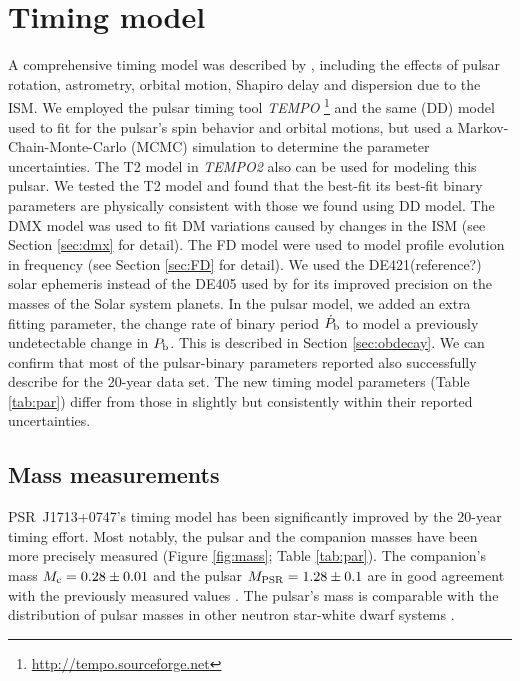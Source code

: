 \section{Timing model}
\label{sec:model}
A comprehensive timing model was described by \citet{sns+05},
including the effects of pulsar rotation, astrometry, orbital motion,
Shapiro delay and dispersion due to the ISM.
We employed the pulsar timing tool \textit{TEMPO}
\footnote{\url{http://tempo.sourceforge.net}} and the same
\citet{dd86} (DD) model \citet{sns+05} used to fit for the pulsar's
spin behavior and orbital motions, but used a Markov-Chain-Monte-Carlo
(MCMC) simulation to determine the parameter uncertainties.
The T2 model \citep{??} in \textit{TEMPO2} \citep{hem06} also can be used for modeling this pulsar. We tested the T2 model and found that the best-fit its best-fit binary parameters are physically consistent with those we found using DD model.
The DMX model was used to fit DM variations caused by changes in the ISM (see Section \ref{sec:dmx} for detail). The FD model were used to model profile
evolution in frequency (see Section \ref{sec:FD} for detail). 
We used the DE421(reference?) solar ephemeris instead of the DE405 used by
\citet{sns+05} for its improved precision on the masses of the Solar system planets. 
In the pulsar model, we added an extra fitting parameter, the change rate of binary period $\dot{P}_{\rm b}$ to model a previously undetectable change in $P_{\rm b}$. This is described in Section \ref{sec:obdecay}.    
We can confirm that most of the pulsar-binary parameters reported
\citet{sns+05} also successfully describe for the 20-year data
set. The new timing model parameters (Table \ref{tab:par}) differ from
those in \citet{sns+05} slightly but consistently within their reported uncertainties.



\subsection{Mass measurements}
\label{sec:mass}
PSR~J1713+0747's timing model has been significantly improved by the 20-year timing effort.
Most
notably, the pulsar and the companion masses have been more precisely measured
(Figure \ref{fig:mass}; Table \ref{tab:par}). The
companion's mass $M_{\rm c} = 0.28\pm0.01$ and the pulsar $M_{\rm PSR}=1.28\pm0.1$ are in good agreement with the previously measured values \cite{sns+05}.
The pulsar's mass is comparable with the distribution of pulsar masses
in other neutron star-white dwarf systems \citep{kkdt13}.

